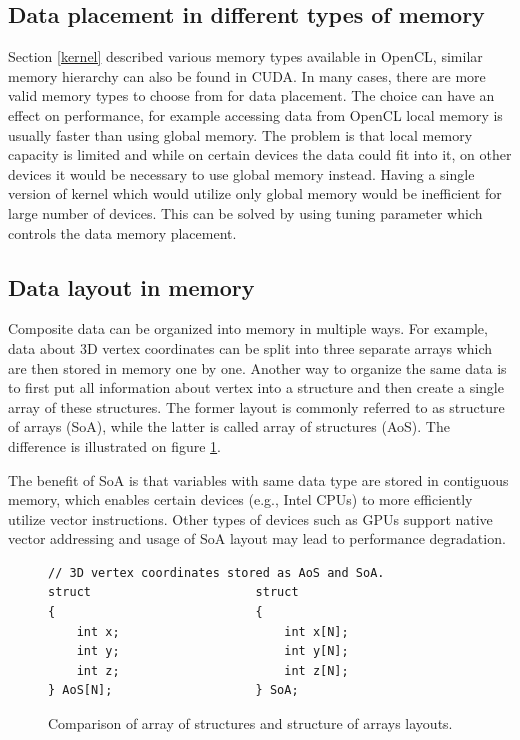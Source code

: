\documentclass
[
    digital, %
    oneside, %
    table, %
    nolof, %
    nolot, %
    nocover %
]{fithesis3}
\begin{document}
\subsection{Data placement in different types of memory}
Section \ref{kernel} described various memory types available in OpenCL, similar memory hierarchy can also be found in CUDA. In many cases, there are
more valid memory types to choose from for data placement. The choice can have an effect on performance, for example accessing data from OpenCL local
memory is usually faster than using global memory. The problem is that local memory capacity is limited and while on certain devices the data could
fit into it, on other devices it would be necessary to use global memory instead. Having a single version of kernel which would utilize only global
memory would be inefficient for large number of devices. This can be solved by using tuning parameter which controls the data memory placement.

\subsection{Data layout in memory}
Composite data can be organized into memory in multiple ways. For example, data about 3D vertex coordinates can be split into three separate arrays
which are then stored in memory one by one. Another way to organize the same data is to first put all information about vertex into a structure and
then create a single array of these structures. The former layout is commonly referred to as structure of arrays (SoA), while the latter is called
array of structures (AoS). The difference is illustrated on figure \ref{aos_soa}.

The benefit of SoA is that variables with same data type are stored in contiguous memory, which enables certain devices (e.g., Intel CPUs) to more
efficiently utilize vector instructions. Other types of devices such as GPUs support native vector addressing and usage of SoA layout may lead to
performance degradation.

\begin{figure}
\begin{lstlisting}
// 3D vertex coordinates stored as AoS and SoA.
struct                       struct
{                            {
    int x;                       int x[N];
    int y;                       int y[N];
    int z;                       int z[N];
} AoS[N];                    } SoA;
\end{lstlisting}
\caption{Comparison of array of structures and structure of arrays layouts.}
\label{aos_soa}
\end{figure}
\end{document}
